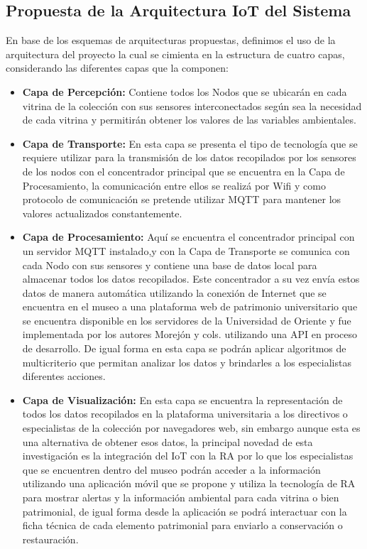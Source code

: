     \subsection{Propuesta de la Arquitectura IoT del Sistema}

    En base de los esquemas de arquitecturas propuestas, definimos el uso de la arquitectura del proyecto la cual se cimienta en la estructura de cuatro capas, considerando las diferentes capas que la componen:
    
    \begin{itemize}
        \item \textbf{Capa de Percepción: }Contiene todos los Nodos que se ubicarán en cada vitrina de la colección con sus sensores interconectados según sea la necesidad de cada vitrina y permitirán obtener los valores de las variables ambientales.
        \item \textbf{Capa de Transporte: }En esta capa se presenta el tipo de tecnología que se requiere utilizar para la transmisión de los datos recopilados por los sensores de los nodos con el concentrador principal que se encuentra en la Capa de Procesamiento, la comunicación entre ellos se realizá por Wifi y como protocolo de comunicación se pretende utilizar MQTT para mantener los valores actualizados constantemente.
        \item \textbf{Capa de Procesamiento: }Aquí se encuentra el concentrador principal con un servidor MQTT instalado,y con la Capa de Transporte se comunica con cada Nodo con sus sensores y contiene una base de datos local para almacenar todos los datos recopilados. Este concentrador a su vez envía estos datos de manera automática utilizando la conexión de Internet que se encuentra en el museo a una plataforma web de patrimonio universitario que se encuentra disponible en los servidores de la Universidad de Oriente y fue implementada por los autores Morejón y cols.\cite{morejon} utilizando una API en proceso de desarrollo. De igual forma en esta capa se podrán aplicar algoritmos de multicriterio que permitan analizar los datos y brindarles a los especialistas diferentes acciones.
        \item \textbf{Capa de Visualización: }En esta capa se encuentra la representación de todos los datos recopilados en la plataforma universitaria a los directivos o especialistas de la colección por navegadores web, sin embargo aunque esta es una alternativa de obtener esos datos, la principal novedad de esta investigación es la integración del IoT con la RA por lo que los especialistas que se encuentren dentro del museo podrán acceder a la información utilizando una aplicación móvil que se propone y utiliza la tecnología de RA para mostrar alertas y la información ambiental para cada vitrina o bien patrimonial, de igual forma desde la aplicación se podrá interactuar con la ficha técnica de cada elemento patrimonial para enviarlo a conservación o restauración. 
    \end{itemize}

